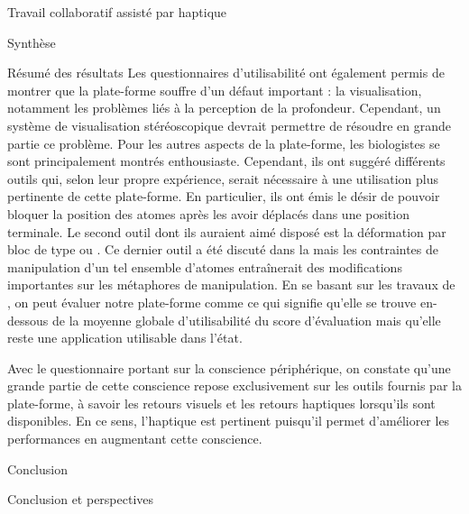 \documentclass[myfrancais,ngerman,english,frenchb]{mythesis}
\begin{document}
\begin{mychapter}{Travail collaboratif assisté par haptique}
\begin{mysection}{Synthèse}
\begin{mysubsection}{Résumé des résultats}
				Les questionnaires d'utilisabilité ont également permis de montrer que la plate-forme souffre d'un défaut important : la visualisation, notamment les problèmes liés à la perception de la profondeur.
				Cependant, un système de visualisation stéréoscopique devrait permettre de résoudre en grande partie ce problème.
				Pour les autres aspects de la plate-forme, les biologistes se sont principalement montrés enthousiaste.
				Cependant, ils ont suggéré différents outils qui, selon leur propre expérience, serait nécessaire à une utilisation plus pertinente de cette plate-forme.
				En particulier, ils ont émis le désir de pouvoir bloquer la position des atomes après les avoir déplacés dans une position terminale.
				Le second outil dont ils auraient aimé disposé est la déformation par bloc de type \myhelice ou \myfeuillet.
				Ce dernier outil a été discuté dans la  mais les contraintes de manipulation d'un tel ensemble d'atomes entraînerait des modifications importantes sur les métaphores de manipulation.
				En se basant sur les travaux de , on peut évaluer notre plate-forme comme \og {} \fg ce qui signifie qu'elle se trouve en-dessous de la moyenne globale d'utilisabilité du score d'évaluation  mais qu'elle reste une application utilisable dans l'état.

				Avec le questionnaire portant sur la conscience périphérique, on constate qu'une grande partie de cette conscience repose exclusivement sur les outils fournis par la plate-forme, à savoir les retours visuels et les retours haptiques lorsqu'ils sont disponibles.
				En ce sens, l'haptique est pertinent puisqu'il permet d'améliorer les performances en augmentant cette conscience.
			\end{mysubsection}
			\begin{mysubsection}{Conclusion}
			\end{mysubsection}
		\end{mysection}
	\end{mychapter}
	\begin{mychapter+}{Conclusion et perspectives}
	\end{mychapter+}
	\mybiblio%
	\myglossary
	\myappendix
\end{document}

